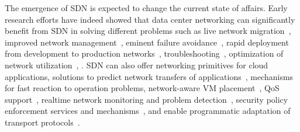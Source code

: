 The emergence of SDN is expected to change the current state of affairs.
Early research efforts have indeed showed that data center networking can significantly benefit from SDN in solving different problems such as live network migration~\cite{keller2012}, improved network management~\cite{keller2012,arefin2013}, eminent failure avoidance~\cite{keller2012,arefin2013}, rapid deployment from development to production networks~\cite{keller2012}, troubleshooting~\cite{keller2012,raghavendra2012},  optimization of network utilization~\cite{raghavendra2012,wang2012,das2013,arefin2013}, . 
SDN can also offer networking primitives for cloud applications, solutions to predict network transfers of applications~\cite{wang2012,das2013}, mechanisms for fast reaction to operation problems, network-aware VM placement~\cite{raghavendra2012,benson2011},  QoS support~\cite{raghavendra2012,benson2011}, realtime network monitoring and problem detection~\cite{raghavendra2012,das2013,arefin2013}, security policy enforcement services and mechanisms~\cite{raghavendra2012,benson2011}, and enable programmatic adaptation of transport protocols~\cite{wang2012,ghobadi2013}.

%

